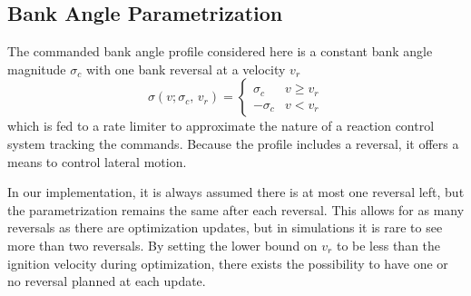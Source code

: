 \documentclass[letterpaper, preprint, paper,11pt]{AAS}
\begin{document}

\subsection{Bank Angle Parametrization}

The commanded bank angle profile considered here is a constant bank angle magnitude $\sigma_c$ with one bank reversal at a velocity $v_r$
\begin{equation}
\sigma(v; \sigma_c, \,v_r) = \left\{
\begin{array}{ll}
\sigma_c & v\geq v_r \\
-\sigma_c & v < v_r
\end{array} 
\right.
\end{equation}
which is fed to a rate limiter to approximate the nature of a reaction control system tracking the commands. Because the profile includes a reversal, it offers a means to control lateral motion. 

In our implementation, it is always assumed there is at most one reversal left, but the parametrization remains the same after each reversal. This allows for as many reversals as there are optimization updates, but in simulations it is rare to see more than two reversals. By setting the lower bound on $v_r$ to be less than the ignition velocity during optimization, there exists the possibility to have one or no reversal planned at each update.
\end{document}
